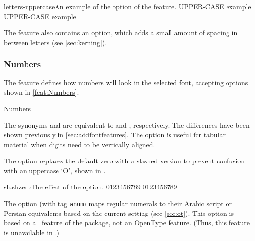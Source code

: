 \begin{Lexample}{letters-uppercase}{An example of the  option of the  feature.}
   UPPER-CASE example \\
   UPPER-CASE example
\end{Lexample}

The  feature also contains an  option,
which adds a small amount of spacing in between letters (see \vref{sec:kerning}).

\subsubsection{Numbers}

The  feature defines how numbers will look in the
selected font, accepting options shown in \ref{feat:Numbers}.

\begin{features}{Numbers}
\end{features}

The synonyms
 and  are equivalent to  and
, respectively.
The differences have been shown previously
in \vref{sec:addfontfeatures}.
The  option is useful for tabular material when digits need
to be vertically aligned.

The  option
replaces the default zero with a slashed version to prevent
confusion with an uppercase `O', shown in .

\begin{Lexample}{slashzero}{The effect of the  option.}
   0123456789
   0123456789
\end{Lexample}

The  option (with tag \verb|anum|) maps regular numerals to their Arabic script or Persian equivalents
based on the current  setting (see \vref{sec:ot}).
This option is based on a \LuaTeX\ feature of the  package,
not an OpenType feature. (Thus, this feature is unavailable in \XeTeX.)

